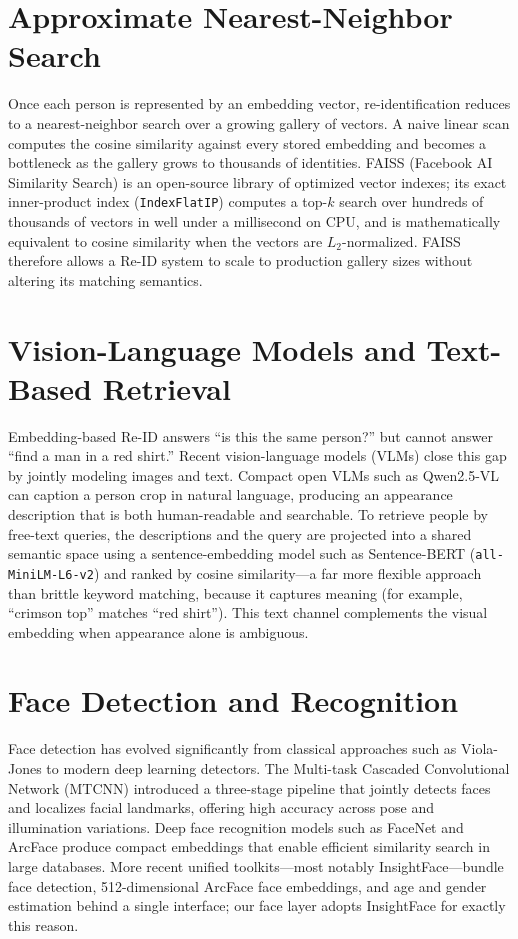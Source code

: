 \documentclass[12pt]{report}
\begin{document}
\section{Approximate Nearest-Neighbor Search}
Once each person is represented by an embedding vector, re-identification reduces to a nearest-neighbor search over a growing gallery of vectors. A naive linear scan computes the cosine similarity against every stored embedding and becomes a bottleneck as the gallery grows to thousands of identities. FAISS (Facebook AI Similarity Search) is an open-source library of optimized vector indexes; its exact inner-product index (\texttt{IndexFlatIP}) computes a top-$k$ search over hundreds of thousands of vectors in well under a millisecond on CPU, and is mathematically equivalent to cosine similarity when the vectors are $L_2$-normalized. FAISS therefore allows a Re-ID system to scale to production gallery sizes without altering its matching semantics.

\section{Vision-Language Models and Text-Based Retrieval}
Embedding-based Re-ID answers ``is this the same person?'' but cannot answer ``find a man in a red shirt.'' Recent vision-language models (VLMs) close this gap by jointly modeling images and text. Compact open VLMs such as Qwen2.5-VL can caption a person crop in natural language, producing an appearance description that is both human-readable and searchable. To retrieve people by free-text queries, the descriptions and the query are projected into a shared semantic space using a sentence-embedding model such as Sentence-BERT (\texttt{all-MiniLM-L6-v2}) and ranked by cosine similarity---a far more flexible approach than brittle keyword matching, because it captures meaning (for example, ``crimson top'' matches ``red shirt''). This text channel complements the visual embedding when appearance alone is ambiguous.

\section{Face Detection and Recognition}
Face detection has evolved significantly from classical approaches such as Viola-Jones to modern deep learning detectors. The Multi-task Cascaded Convolutional Network (MTCNN) introduced a three-stage pipeline that jointly detects faces and localizes facial landmarks, offering high accuracy across pose and illumination variations. Deep face recognition models such as FaceNet and ArcFace produce compact embeddings that enable efficient similarity search in large databases. More recent unified toolkits---most notably InsightFace---bundle face detection, 512-dimensional ArcFace face embeddings, and age and gender estimation behind a single interface; our face layer adopts InsightFace for exactly this reason.
\end{document}
